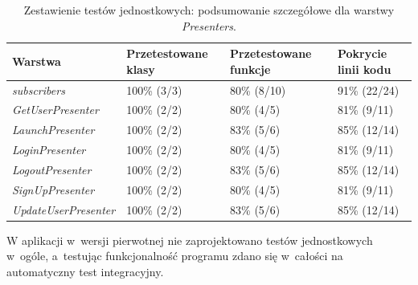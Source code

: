 \begin{table}[!htb]
\centering
\caption{Zestawienie testów jednostkowych: podsumowanie szczegółowe dla warstwy \textit{Presenters}.}
\label{tab:testy_jednostkowe_presenters}
\begin{tabular}{|l|l|l|l|}
\hline
\textbf{Warstwa} & \textbf{Przetestowane klasy} & \textbf{Przetestowane funkcje} & \textbf{Pokrycie linii kodu} \\ \hline
\textit{subscribers} & 100\% (3/3) & 80\% (8/10) & 91\% (22/24)	\\ \hline
\textit{GetUserPresenter} & 100\% (2/2) & 80\% (4/5) & 81\% (9/11)	\\ \hline
\textit{LaunchPresenter} & 100\% (2/2) & 83\% (5/6) & 85\% (12/14)	\\ \hline
\textit{LoginPresenter} & 100\% (2/2) & 80\% (4/5) & 81\% (9/11)	\\ \hline
\textit{LogoutPresenter} & 100\% (2/2) & 83\% (5/6) & 85\% (12/14)	\\ \hline
\textit{SignUpPresenter} & 100\% (2/2) & 80\% (4/5) & 81\% (9/11)	\\ \hline
\textit{UpdateUserPresenter} & 100\% (2/2) & 83\% (5/6) & 85\% (12/14)	\\ \hline
\end{tabular}
\end{table}

%
%

W aplikacji w~wersji pierwotnej nie zaprojektowano testów jednostkowych w~ogóle, a~testując funkcjonalność programu zdano się w~całości na automatyczny test integracyjny. 

